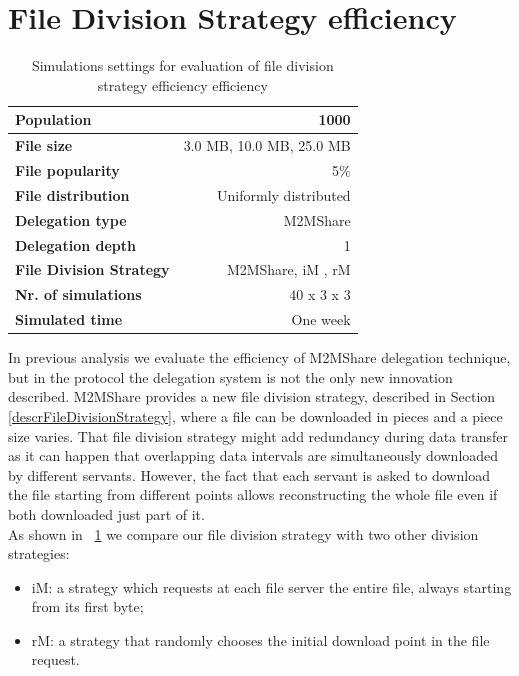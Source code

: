 \section{File Division Strategy efficiency}
\begin{table}[h]
\begin{center}
\begin{tabular}{|l|r|}
\hline
\bfseries Population & 1000 \\
\hline
\bfseries File size & 3.0 MB, 10.0 MB, 25.0 MB \\
\hline
\bfseries File popularity & 5\% \\
\hline
\bfseries File distribution & Uniformly distributed \\
\hline
\bfseries Delegation type & M2MShare \\
\hline
\bfseries Delegation depth & 1 \\
\hline
\bfseries File Division Strategy & M2MShare, iM , rM \\
\hline
\bfseries Nr. of simulations & 40 x 3 x 3\\
\hline
\bfseries Simulated time & One week \\
\hline
\end{tabular}
\end{center}
\caption{Simulations settings for evaluation of file division strategy efficiency efficiency\label{tab:settingsFDS}}
\end{table}
In previous analysis we evaluate the efficiency of M2MShare delegation technique, but in the protocol the delegation system is not the only new innovation described. M2MShare provides a new file division strategy, described in Section \ref{descrFileDivisionStrategy}, where a file can be downloaded in pieces and a piece size varies. That file division strategy might add redundancy during data transfer as it can happen that overlapping data intervals are simultaneously downloaded by different servants. However, the fact that each servant is asked to download the file starting from different points allows reconstructing the whole file even if both downloaded just part of it. \\
As shown in \tablename~\ref{tab:settingsFDS} we compare our file division strategy with two other division strategies:
\begin{itemize}
\item iM: a strategy which requests at each file server the
entire file, always starting from its first byte;
\item rM: a strategy that randomly chooses the initial
download point in the file request.
\end{itemize}

